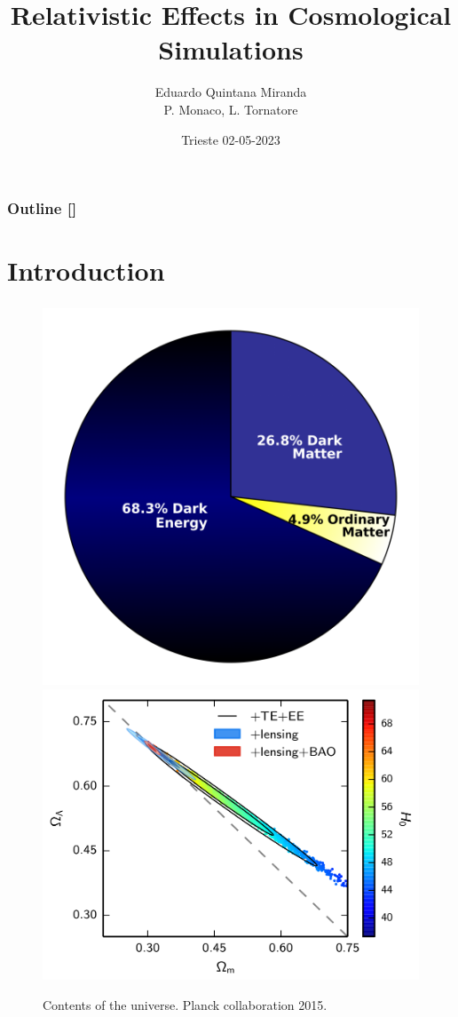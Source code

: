 \documentclass{beamer}
\title{Relativistic Effects in Cosmological Simulations}
\author{Eduardo Quintana Miranda\\P. Monaco, L. Tornatore}
\date{Trieste 02-05-2023}
\makeatletter
\newcommand{\mylabel}{%
   [\beamer@againname]}
\makeatother
\begin{document}
\begin{frame}[label=title]
    \titlepage
\end{frame}

\begin{frame}[label=toc]
    \frametitle{Outline\mylabel}
    \tableofcontents
\end{frame}

\section{Introduction}
\frame{\sectionpage}

\begin{frame}[label=cosmologyLCDM]
    \frametitle{\insertsection\mylabel}
    \begin{figure}
        \includegraphics[width=.39\textwidth]{images/dark-sector.png}
        \includegraphics[width=.59\textwidth]{images/planck2015.png}
	\caption{Contents of the universe.
	Planck collaboration 2015.}
    \end{figure}
\end{frame}
\end{document}
